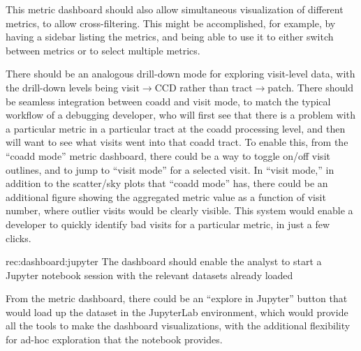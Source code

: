 This metric dashboard should also allow simultaneous visualization of different metrics, to allow cross-filtering.
This might be accomplished, for example, by having a sidebar listing the metrics, and being able to use it to either switch between metrics or to select multiple metrics.

There should be an analogous drill-down mode for exploring visit-level data, with the drill-down levels being visit$\rightarrow$CCD rather than tract$\rightarrow$patch.
There should be seamless integration between coadd and visit mode, to match the typical workflow of a debugging developer, who will first see that there is a problem with a particular metric in a particular tract at the coadd processing level, and then will want to see what visits went into that coadd tract.
To enable this, from the ``coadd mode'' metric dashboard, there could be a way to toggle on/off visit outlines, and to jump to ``visit mode'' for a selected visit.
In ``visit mode,'' in addition to the scatter/sky plots that ``coadd mode'' has, there could be an additional figure showing the aggregated metric value as a function of visit number, where outlier visits would be clearly visible.
This system would enable a developer to quickly identify bad visits for a particular metric, in just a few clicks.

\begin{recommendation}
    {rec:dashboard:jupyter}
    {The dashboard should enable the analyst to start a Jupyter notebook session with the relevant datasets already loaded}
\end{recommendation}

From the metric dashboard, there could be an ``explore in Jupyter'' button that would load up the dataset in the JupyterLab environment, which would provide all the tools to make the dashboard visualizations, with the additional flexibility for ad-hoc exploration that the notebook provides.
